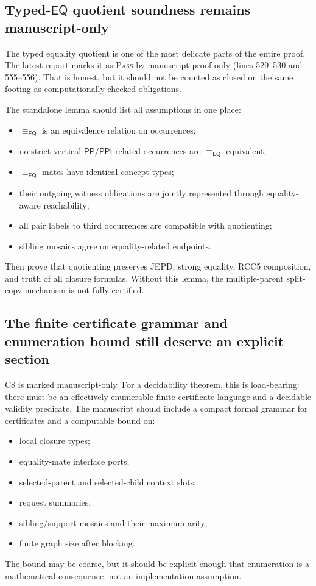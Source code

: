 \documentclass[11pt]{article}
\newcommand{\PP}{\mathsf{PP}}
\newcommand{\PPI}{\mathsf{PPI}}
\newcommand{\EQ}{\mathsf{EQ}}
\newcommand{\PASS}{\textsc{Pass}}
\begin{document}
\subsection{Typed-\(\EQ\) quotient soundness remains manuscript-only}

The typed equality quotient is one of the most delicate parts of the entire
proof.  The latest report marks it as \PASS{} by manuscript proof only (lines
529--530 and 555--556).  That is honest, but it should not be counted as closed
on the same footing as computationally checked obligations.

The standalone lemma should list all assumptions in one place:
\begin{itemize}[leftmargin=2em]
  \item \(\equiv_{\EQ}\) is an equivalence relation on occurrences;
  \item no strict vertical \(\PP/\PPI\)-related occurrences are
    \(\equiv_{\EQ}\)-equivalent;
  \item \(\equiv_{\EQ}\)-mates have identical concept types;
  \item their outgoing witness obligations are jointly represented through
    equality-aware reachability;
  \item all pair labels to third occurrences are compatible with quotienting;
  \item sibling mosaics agree on equality-related endpoints.
\end{itemize}
Then prove that quotienting preserves JEPD, strong equality, RCC5 composition,
and truth of all closure formulas.  Without this lemma, the multiple-parent
split-copy mechanism is not fully certified.

\subsection{The finite certificate grammar and enumeration bound still deserve an explicit section}

C8 is marked manuscript-only.  For a decidability theorem, this is load-bearing:
there must be an effectively enumerable finite certificate language and a
decidable validity predicate.  The manuscript should include a compact formal
grammar for certificates and a computable bound on:
\begin{itemize}[leftmargin=2em]
  \item local closure types;
  \item equality-mate interface ports;
  \item selected-parent and selected-child context slots;
  \item request summaries;
  \item sibling/support mosaics and their maximum arity;
  \item finite graph size after blocking.
\end{itemize}
The bound may be coarse, but it should be explicit enough that enumeration is a
mathematical consequence, not an implementation assumption.
\end{document}
